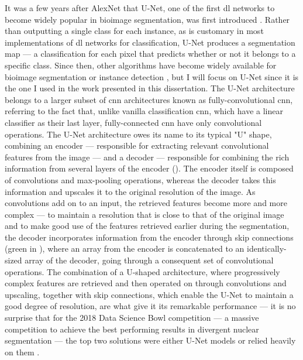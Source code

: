It was a few years after AlexNet that U-Net, one of the first \ac{dl} networks to become widely popular in bioimage segmentation, was first introduced \cite{Ronneberger2015-do}. Rather than outputting a single class for each instance, as is customary in most implementations of \ac{dl} networks for classification, U-Net produces a segmentation map --- a classification for each pixel that predicts whether or not it belongs to a specific class. Since then, other algorithms have become widely available for bioimage segmentation or instance detection \cite{Lucas2021-hc}, but I will focus on U-Net since it is the one I used in the work presented in this dissertation. The U-Net architecture belongs to a larger subset of \ac{cnn} architectures known as fully-convolutional \ac{cnn}, referring to the fact that, unlike vanilla classification \ac{cnn}, which have a linear classifier as their last layer, fully-connected \ac{cnn} have only convolutional operations. The U-Net architecture owes its name to its typical "U" shape, combining an encoder --- responsible for extracting relevant convolutional features from the image --- and a decoder --- responsible for combining the rich information from several layers of the encoder (). The encoder itself is composed of convolutions and max-pooling operations, whereas the decoder takes this information and upscales it to the original resolution of the image. As convolutions add on to an input, the retrieved features become more and more complex --- to maintain a resolution that is close to that of the original image and to make good use of the features retrieved earlier during the segmentation, the decoder incorporates information from the encoder through skip connections (green in ), where an array from the encoder is concatenated to an identically-sized array of the decoder, going through a consequent set of convolutional operations. The combination of a U-shaped architecture, where progressively complex features are retrieved and then operated on through convolutions and upscaling, together with skip connections, which enable the U-Net to maintain a good degree of resolution, are what give it its remarkable performance --- it is no surprise that for the 2018 Data Science Bowl competition --- a massive competition to achieve the best performing results in divergent nuclear segmentation --- the top two solutions were either U-Net models or relied heavily on them \cite{Seferbekov_undated-br,jacobkie_undated-tc}. 

\begin{figure}
	\label{fig:u-net}
\end{figure}

